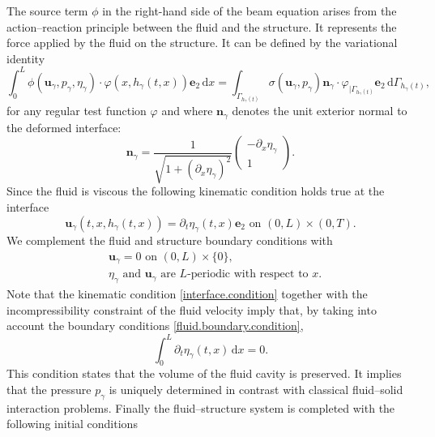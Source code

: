 \documentclass[JEP,XML,SOM,Unicode,NoFloatCountersInSection]{cedram}
\theoremstyle{remark}
\theoremstyle{definition}
\newcommand{\ug}{\boldsymbol{u}}
\newcommand{\dd}{\,\mathrm{d}}
\newcommand{\normal}{\BS{n}}
\newcommand{\BS}[1]{\boldsymbol{#1}}
\begin{document}
The source term $\phi$ in the right-hand side of the beam equation arises from the action--reaction principle between the fluid and the structure. It represents the force applied by the fluid on the structure. It can be defined by the variational identity
\begin{equation}
\label{def:forcefluide}
\int_{0}^{L}\phi(\ug_{\gamma},p_{\gamma},\eta_{\gamma})\cdot \varphi(x,h_{\gamma}(t,x))\BS{e}_{2}\dd x=\int_{\Gamma_{h_{\gamma}(t)}}\sigma(\ug_{\gamma},p_{\gamma})\normal_{\gamma}\cdot \varphi_{\vert \Gamma_{h_{\gamma}(t)}}\BS{e}_{2}\dd \Gamma_{h_{\gamma}(t)},
\end{equation}
for any regular test function $\varphi$ and where $\normal_{\gamma}$ denotes the unit exterior normal to the deformed interface:\vspace*{-3pt}
\[
\normal_{\gamma}=\frac{1}{\sqrt{1+(\partial_{x}\eta_{\gamma})^{2}}}\begin{pmatrix}
-\partial_{x}\eta_{\gamma}\\
1
\end{pmatrix}.
\]
Since the fluid is viscous the following kinematic condition holds true at the interface%
\begin{equation}\label{interface.condition}
\ug_{\gamma}(t,x,h_\gamma(t,x))=\partial_{t}\eta_{\gamma}(t,x)\BS{e}_{2}\text{ on } (0, L)\times (0, T).
\end{equation}
We complement the fluid and structure boundary conditions with
\begin{equation}\label{fluid.boundary.condition}
\begin{aligned}
&\ug_{\gamma}=0\text{ on }(0,L)\times \{0\},\\
&\eta_{\gamma}\text{ and }\ug_{\gamma}\text{ are }L\text{-periodic with respect to }x.
\end{aligned}
\end{equation}
Note that the kinematic condition \eqref{interface.condition} together with the incompressibility constraint of the fluid velocity imply that, by taking into account the boundary conditions \eqref{fluid.boundary.condition},%
\begin{equation}\label{compatibilite-vitesse-structure}
\int_0^L\partial_t \eta_\gamma(t,x) \dd x =0.
\end{equation}
This condition states that the volume of the fluid cavity is preserved.
It implies that the pressure $p_{\gamma}$ is uniquely determined in contrast with classical fluid--solid interaction problems.
Finally the fluid--structure system is completed with the following initial conditions
\end{document}
